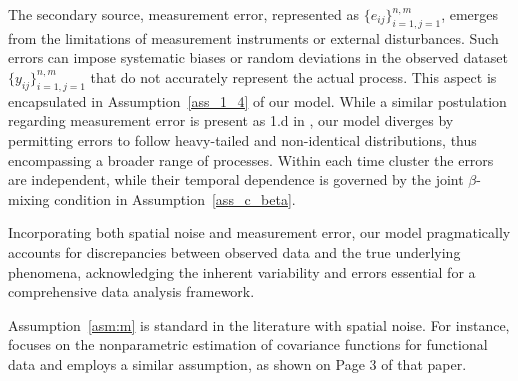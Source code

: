 \documentclass[twoside,11pt]{article}
\newcommand{\rev}[1]{{\color{revisionred}#1}}
\begin{document}
The secondary source, measurement error, represented as \(\{e_{ij}\}_{i=1,j=1}^{n,m}\), emerges from the limitations of measurement instruments or external disturbances. Such errors can impose systematic biases or random deviations in the observed dataset \(\{y_{ij}\}_{i=1,j=1}^{n,m}\) that do not accurately represent the actual process. This aspect is encapsulated in Assumption~\ref{ass_1_4} of our model. While a similar postulation regarding measurement error is present as 1.d in \cite{padilla2023temporal}, our model diverges by permitting errors to follow heavy-tailed and non-identical distributions, thus encompassing a broader range of processes. \rev{Within each time cluster the errors are independent, while their temporal dependence is governed by the joint $\beta$-mixing condition in Assumption~\ref{ass_c_beta}.}

Incorporating both spatial noise and measurement error, our model pragmatically accounts for discrepancies between observed data and the true underlying phenomena, acknowledging the inherent variability and errors essential for a comprehensive data analysis framework.

Assumption~\ref{asm:m} is standard in the literature with spatial noise. For instance, \cite{wang2022low} focuses on the nonparametric estimation of covariance functions for functional data and employs a similar assumption, as shown on Page 3 of that paper.



\end{document}
